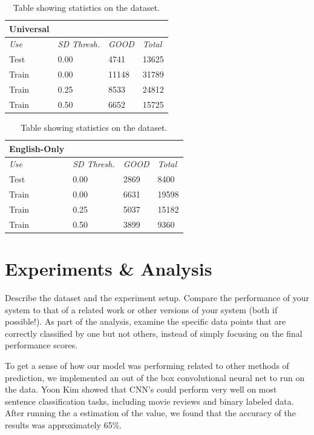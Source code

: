 \documentclass[a4paper,12pt]{article}
\begin{document}
\begin{table}[h]
  \small
  \centering
  \begin{tabular}{|l|l|l|l|}
    \hline
    \textbf{Universal}&&& \\ \hline \hline
    \textit{Use} & \textit{SD Thresh.} & \textit{GOOD} & \textit{Total} \\ \hline 
    Test & 0.00 & 4741 & 13625 \\ \hline
    Train & 0.00 & 11148 & 31789 \\ \hline
    Train & 0.25 & 8533 & 24812 \\ \hline
    Train & 0.50 & 6652 & 15725 \\ \hline
  \end{tabular}
  \quad
  \begin{tabular}{|l||l|l|l|}
    \hline
    \textbf{English-Only}&&& \\ \hline \hline
    \textit{Use} & \textit{SD Thresh.} & \textit{GOOD} & \textit{Total} \\ \hline 
    Test & 0.00 & 2869 & 8400 \\ \hline
    Train & 0.00 & 6631 & 19598 \\ \hline
    Train & 0.25 & 5037 & 15182 \\ \hline
    Train & 0.50 & 3899 & 9360 \\ \hline
  \end{tabular}

  \caption{Table showing statistics on the dataset.}
  \label{table:dataset-stats}
\end{table}

\section{Experiments \& Analysis}
Describe the dataset and the experiment setup. Compare the
performance of your system to that of a related work or other versions of your system (both if
possible!). As part of the analysis, examine the specific data points that are correctly classified by
one but not others, instead of simply focusing on the final performance scores.



To get a sense of how our model was performing related to other methods of prediction, we implemented an out of the box convolutional neural net to run on the data.  Yoon Kim showed that CNN's could perform very well on most sentence classification tasks, including movie reviews and binary labeled data. After running the a estimation of the value, we found that the accuracy of the results was approximately 65\%.
\end{document}

